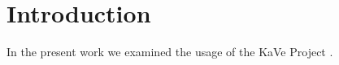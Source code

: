 \section{Introduction}
In the present work we examined the usage of the KaVe Project \cite{Kave}. 

